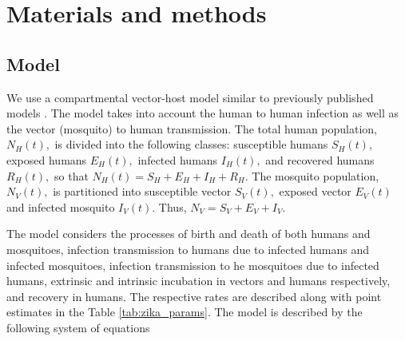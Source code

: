 \documentclass[10pt,letterpaper]{article}
\begin{document}
    
\section*{Materials and methods}
\subsection*{Model}
We use a compartmental vector-host model similar to previously published models \cite{bonyah2017theoretical,moreno2017role,suparit2018mathematical,dantas2018calibration}. The model takes into account the human to human infection as well as the vector (mosquito) to human transmission. The total human population, $N_{H}(t),$ is divided into the following classes: susceptible humans $S_{H}(t),$ exposed humans $E_{H}(t),$ infected humans $I_{H}(t),$ and recovered humans $R_{H}(t),$ so that $N_{H}(t)=S_{H}+E_{H}+I_{H}+R_{H}$. The mosquito population, $N_{V}(t),$ is partitioned into susceptible vector $S_{V}(t),$ exposed vector $E_{V}(t)$ and infected mosquito $I_{V}(t)$. Thus, $N_{V}=S_{V}+E_{V}+I_{V}$.

The model considers the processes of birth and death of both humans and mosquitoes, infection transmission to humans due to infected humans and infected mosquitoes, infection transmission to he mosquitoes due to infected humans, extrinsic and intrinsic incubation in vectors and humans respectively, and recovery in humans. The respective rates are described along with point estimates in the Table \ref{tab:zika_params}. The model is described by the following system of equations
\end{document}
